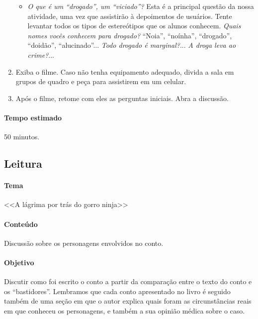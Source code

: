 \documentclass[12pt]{extarticle}
\begin{document}
\begin{enumerate}
\begin{itemize}
			\item \textit{O que é um ``drogado'', um ``viciado''?} Esta é a principal 
			questão da nossa atividade, uma vez que assistirão à depoimentos de 
			usuários. Tente levantar todos os tipos de estereótipos 
			que os alunos conhecem. \textit{Quais nomes vocês conhecem para drogado?}
			``Noia'', ``noínha'', ``drogado'', ``doidão'', ``alucinado''...
			\textit{Todo drogado é marginal?}... \textit{A droga leva ao crime?}...
		\end{itemize}

		\item Exiba o filme. Caso não tenha equipamento adequado, divida a sala em grupos de quadro
		e peça para assistirem em um celular. 
		
		\item Após o filme, retome com eles as perguntas iniciais. Abra a discussão. 
		
    \end{enumerate}

	\paragraph{Tempo estimado} 50 minutos. 




\subsection{Leitura} 


\paragraph{Tema} <<A lágrima por trás do gorro ninja>>

\paragraph{Conteúdo} Discussão sobre os personagens envolvidos no conto. 

\paragraph{Objetivo} Discutir como foi escrito o conto a partir da comparação entre 
o texto do conto e os ``bastidores''. Lembramos que cada conto apresentado no 
livro é seguido também de uma seção em que o autor explica quais foram as 
circunstâncias reais em que conheceu os personagens, e também a sua opinião médica
sobre o caso. 
\end{document}
